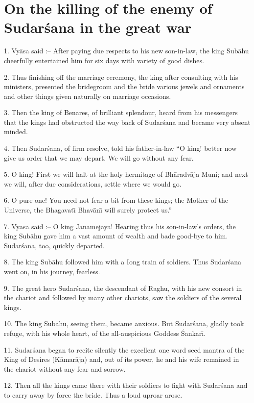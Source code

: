\chapter{On the killing of the enemy of Sudar\'sana in the great war}

1. Vy\=asa said :-- After paying due respects to his new son-in-law, the king Sub\=ahu cheerfully entertained him for six days with variety of good dishes.

2. Thus finishing off the marriage ceremony, the king after consulting with his ministers, presented the bridegroom and the bride various jewels and ornaments and other things given naturally on marriage occasions.

3. Then the king of Benares, of brilliant splendour, heard from his messengers that the kings had obstructed the way back of Sudar\'sana and became very absent minded.

4. Then Sudar\'sana, of firm resolve, told his father-in-law ``O king! better now give us order that we may depart. We will go without any fear.

5. O king! First we will halt at the holy hermitage of Bh\=aradv\=aja Muni; and next we will, after due considerations, settle where we would go.

6. O pure one! You need not fear a bit from these kings; the Mother of the Universe, the Bhagavat\={\i} Bhav\=an\={\i} will surely protect us.''

7. Vy\=asa said :-- O king Janamejaya! Hearing thus his son-in-law's orders, the king Sub\=ahu gave him a vast amount of wealth and bade good-bye to him. Sudar\'sana, too, quickly departed.

8. The king Sub\=ahu followed him with a Iong train of soldiers. Thus Sudar\'sana went on, in his journey, fearless.

9. The great hero Sudar\'sana, the descendant of Raghu, with his new consort in the chariot and followed by many other chariots, saw the soldiers of the several kings.

10. The king Sub\=ahu, seeing them, became anxious. But Sudar\'sana, gladly took refuge, with his whole heart, of the all-auspicious Goddess \'Sankar\={\i}.

11. Sudar\'sana began to recite silently the excellent one word seed mantra of the King of Desires (K\=amar\=aja) and, out of its power, he and his wife remained in the chariot without any fear and sorrow.

12. Then all the kings came there with their soldiers to fight with Sudar\'sana and to carry away by force the bride. Thus a loud uproar arose.

